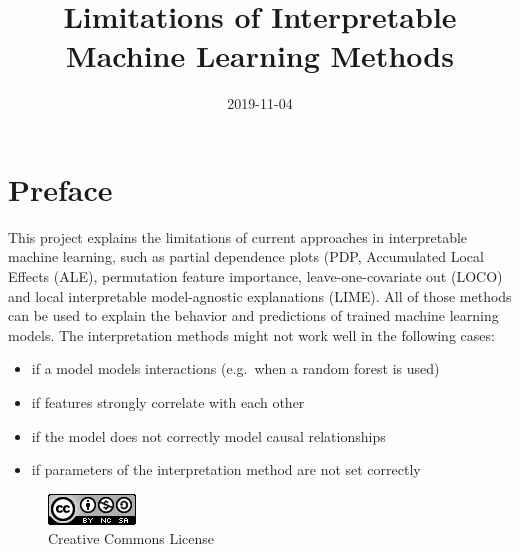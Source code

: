 \documentclass[
]{krantz}
\title{Limitations of Interpretable Machine Learning Methods}
\date{2019-11-04}
\providecommand{\tightlist}{%
  \setlength{\itemsep}{0pt}\setlength{\parskip}{0pt}}
\begin{document}
\maketitle


\thispagestyle{empty}

\begin{center}
\end{center}

\setlength{\abovedisplayskip}{-5pt}
\setlength{\abovedisplayshortskip}{-5pt}

{
\hypersetup{linkcolor=}
\setcounter{tocdepth}{0}
\tableofcontents
}
\listoftables
\listoffigures
\hypertarget{preface}{%
\chapter*{Preface}\label{preface}}


This project explains the limitations of current approaches in interpretable machine learning, such as partial dependence plots (PDP, Accumulated Local Effects (ALE), permutation feature importance, leave-one-covariate out (LOCO) and local interpretable model-agnostic explanations (LIME).
All of those methods can be used to explain the behavior and predictions of trained machine learning models.
The interpretation methods might not work well in the following cases:

\begin{itemize}
\tightlist
\item
  if a model models interactions (e.g.~when a random forest is used)
\item
  if features strongly correlate with each other
\item
  if the model does not correctly model causal relationships
\item
  if parameters of the interpretation method are not set correctly
\end{itemize}

\begin{figure}
\centering
\includegraphics{images/by-nc-sa.png}
\caption{Creative Commons License}
\end{figure}
\end{document}
